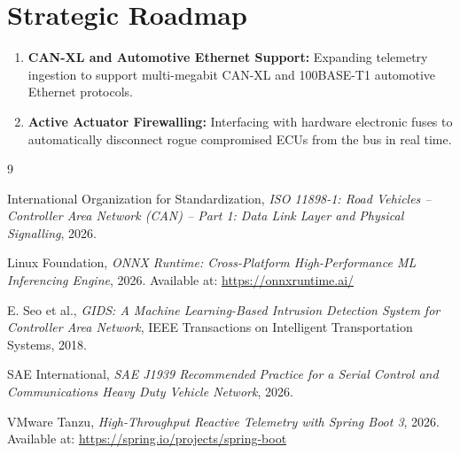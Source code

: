 \documentclass[12pt,a4paper]{report}
\begin{document}
\section{Strategic Roadmap}
\begin{enumerate}[nosep]
    \item \textbf{CAN-XL and Automotive Ethernet Support:} Expanding telemetry ingestion to support multi-megabit CAN-XL and 100BASE-T1 automotive Ethernet protocols.
    \item \textbf{Active Actuator Firewalling:} Interfacing with hardware electronic fuses to automatically disconnect rogue compromised ECUs from the bus in real time.
\end{enumerate}

\cleardoublepage
\begin{thebibliography}{9}

International Organization for Standardization, \textit{ISO 11898-1: Road Vehicles -- Controller Area Network (CAN) -- Part 1: Data Link Layer and Physical Signalling}, 2026.

Linux Foundation, \textit{ONNX Runtime: Cross-Platform High-Performance ML Inferencing Engine}, 2026. Available at: \url{https://onnxruntime.ai/}

E. Seo et al., \textit{GIDS: A Machine Learning-Based Intrusion Detection System for Controller Area Network}, IEEE Transactions on Intelligent Transportation Systems, 2018.

SAE International, \textit{SAE J1939 Recommended Practice for a Serial Control and Communications Heavy Duty Vehicle Network}, 2026.

VMware Tanzu, \textit{High-Throughput Reactive Telemetry with Spring Boot 3}, 2026. Available at: \url{https://spring.io/projects/spring-boot}

\end{thebibliography}
\end{document}
